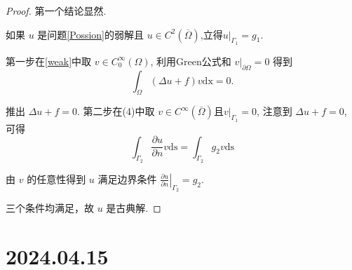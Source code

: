 \documentclass[12pt,a4paper]{article}
\begin{document}
\begin{enumerate}
		\begin{proof}
			第一个结论显然. 
			
			如果 $u$ 是问题\eqref{Possion}的弱解且 $u \in C^2(\overline{\Omega})$,立得$\left.u\right|_{\Gamma_1}=g_1$.
			
			第一步在\eqref{weak}中取 $v \in C_0^{\infty}(\Omega)$, 利用Green公式和 $\left.v\right|_{\partial \Omega}=0$ 得到
			$$
			\int_{\Omega}(\Delta u+f) v \mathrm{dx}=0 .
			$$
			
			推出 $\Delta u+f=0$. 第二步在(4)中取 $v \in C^{\infty}(\overline{\Omega})$且$\left.v\right|_{\Gamma_1} = 0$, 注意到 $\Delta u+f=0$, 可得
			$$
			\int_{\Gamma_2} \frac{\partial u}{\partial n} v \mathrm{ds}=\int_{\Gamma_2} g_2 v \mathrm{ds}
			$$
			
			由 $v$ 的任意性得到 $u$ 满足边界条件 $\left.\frac{\partial u}{\partial n}\right|_{\Gamma_2}=g_2$.
			
			三个条件均满足，故 $u$ 是古典解.
		\end{proof}
	\end{enumerate}
	
	
	\newpage
	
	\section*{2024.04.15}	
	
\end{document}
